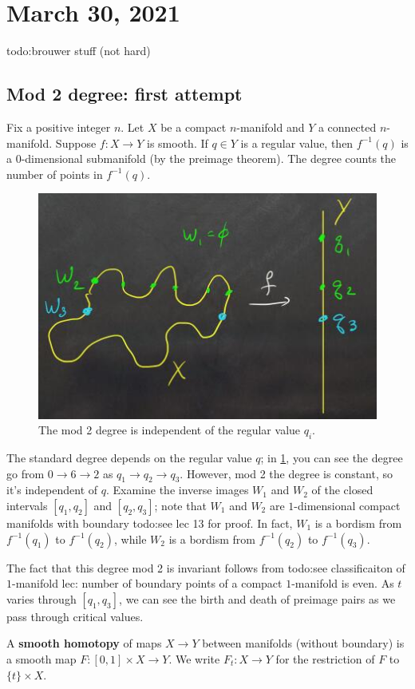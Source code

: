 \section{March 30, 2021} 
{\color{red}todo:brouwer stuff (not hard)} 

\subsection{Mod 2 degree: first attempt}
Fix a positive integer $n$. Let $X$ be a compact $n$-manifold and $Y$ a connected $n$-manifold. Suppose $f \colon X \to Y$ is smooth. If $q \in Y$ is a regular value, then $f ^{-1}(q)$ is a $0$-dimensional submanifold (by the preimage theorem). The degree counts the number of points in $f ^{-1}(q)$.
\begin{figure}[H]
\centering
 \includegraphics[width=0.5\linewidth]{figures/dtop_15.1.jpg}
 \caption{The mod 2 degree is independent of the regular value $q_i $.} 
 \label{mod2indp} 
\end{figure}
The standard degree depends on the regular value $q$; in \cref{mod2indp}, you can see the degree go from $0\to 6\to 2$ as $q_1\to q_2\to q_3$. However, mod 2 the degree is constant, so it's independent of $q$. Examine the inverse images $W_1$ and $W_2$ of the closed intervals $[q_1,q_2]$ and $[q_2,q_3]$; note that $W_1$ and $W_2$ are $1$-dimensional compact manifolds with boundary {\color{red}todo:see lec 13 for proof}. In fact, $W_1$ is a bordism from $f^{-1}(q_1)$ to $f^{-1}(q_2)$, while $W_2$ is a bordism from $f^{-1}(q_2)$ to $f^{-1}(q_3)$. 

The fact that this degree mod 2 is invariant follows from {\color{red}todo:see classificaiton of $1$-manifold lec: number of boundary points of a compact $1$-manifold is even}. As $t$ varies through $[q_1,q_3]$, we can see the birth and death of preimage pairs as we pass through critical values. 

\begin{definition}[]
    A \textbf{smooth homotopy} of maps $X \to Y$ between manifolds (without boundary) is a smooth map $F \colon [0,1] \times X\to Y.$ We write $F_t \colon X \to Y$ for the restriction of $F$ to $\{t\} \times X$.
\end{definition}

